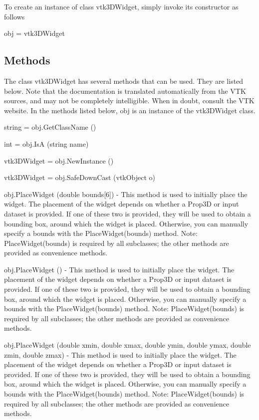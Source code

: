 To create an instance of class vtk3\-D\-Widget, simply invoke its constructor as follows \begin{DoxyVerb}  obj = vtk3DWidget
\end{DoxyVerb}
 \hypertarget{vtkwidgets_vtkxyplotwidget_Methods}{}\subsection{Methods}\label{vtkwidgets_vtkxyplotwidget_Methods}
The class vtk3\-D\-Widget has several methods that can be used. They are listed below. Note that the documentation is translated automatically from the V\-T\-K sources, and may not be completely intelligible. When in doubt, consult the V\-T\-K website. In the methods listed below, {\ttfamily obj} is an instance of the vtk3\-D\-Widget class. 
\begin{DoxyItemize}
\item {\ttfamily string = obj.\-Get\-Class\-Name ()}  
\item {\ttfamily int = obj.\-Is\-A (string name)}  
\item {\ttfamily vtk3\-D\-Widget = obj.\-New\-Instance ()}  
\item {\ttfamily vtk3\-D\-Widget = obj.\-Safe\-Down\-Cast (vtk\-Object o)}  
\item {\ttfamily obj.\-Place\-Widget (double bounds\mbox{[}6\mbox{]})} -\/ This method is used to initially place the widget. The placement of the widget depends on whether a Prop3\-D or input dataset is provided. If one of these two is provided, they will be used to obtain a bounding box, around which the widget is placed. Otherwise, you can manually specify a bounds with the Place\-Widget(bounds) method. Note\-: Place\-Widget(bounds) is required by all subclasses; the other methods are provided as convenience methods.  
\item {\ttfamily obj.\-Place\-Widget ()} -\/ This method is used to initially place the widget. The placement of the widget depends on whether a Prop3\-D or input dataset is provided. If one of these two is provided, they will be used to obtain a bounding box, around which the widget is placed. Otherwise, you can manually specify a bounds with the Place\-Widget(bounds) method. Note\-: Place\-Widget(bounds) is required by all subclasses; the other methods are provided as convenience methods.  
\item {\ttfamily obj.\-Place\-Widget (double xmin, double xmax, double ymin, double ymax, double zmin, double zmax)} -\/ This method is used to initially place the widget. The placement of the widget depends on whether a Prop3\-D or input dataset is provided. If one of these two is provided, they will be used to obtain a bounding box, around which the widget is placed. Otherwise, you can manually specify a bounds with the Place\-Widget(bounds) method. Note\-: Place\-Widget(bounds) is required by all subclasses; the other methods are provided as convenience methods.  

\end{DoxyItemize}
